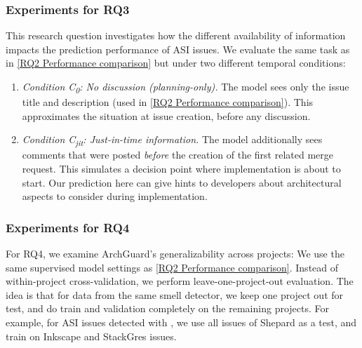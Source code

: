 \subsubsection{Experiments for RQ3}
This research question investigates how the different availability of information impacts the prediction performance of \acl{ASI} issues.
We evaluate the same task as in \ref{RQ2 Performance comparison} but under two different temporal conditions:
\begin{enumerate}
    \item \emph{Condition C\textsubscript{0}: No discussion (planning-only).}
          The model sees only the issue title and description (used in \ref{RQ2 Performance comparison}).
          This approximates the situation at issue creation, before any discussion.
    \item \emph{Condition C\textsubscript{jit}: Just-in-time information.}
          The model additionally sees comments that were posted \emph{before} the creation of the first related merge request.
          This simulates a decision point where implementation is about to start.
          Our prediction here can give hints to developers about architectural aspects to consider during implementation.
\end{enumerate}

\subsubsection{Experiments for RQ4}
For RQ4, we examine ArchGuard's generalizability across projects:
We use the same supervised model settings as \ref{RQ2 Performance comparison}.
Instead of within-project cross-validation, we perform leave-one-project-out evaluation.
The idea is that for data from the same smell detector, we keep one project out for test, and do train and validation completely on the remaining projects.
For example, for ASI issues detected with \ARCADE, we use all issues of Shepard as a test, and train on Inkscape and StackGres issues.


